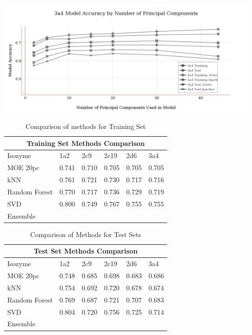\includegraphics[width=1\textwidth]{../img/3a4_moe_model_accuracy.png}

\begin{table}[h]
\begin{tabular}{|l|l|l|l|l|l|}
\hline
\multicolumn{6}{|c|}{Training Set Methods Comparison} \\ \hline
Isozyme       & 1a2   & 2c9   & 2c19  & 2d6   & 3a4   \\ \hline
MOE 20pc      & 0.741 & 0.710 & 0.705 & 0.705 & 0.705 \\ \hline
kNN           & 0.761 & 0.721 & 0.730 & 0.717 & 0.716 \\ \hline
Random Forest & 0.770 & 0.717 & 0.736 & 0.729 & 0.719 \\ \hline
SVD           & 0.800 & 0.749 & 0.767 & 0.755 & 0.755 \\ \hline
Ensemble      &       &       &       &       &       \\ \hline
\end{tabular}
\caption{Comparison of methods for Training Set}
\end{table}


\begin{table}[h]
\begin{tabular}{|l|l|l|l|l|l|}
\hline
\multicolumn{6}{|c|}{Test Set Methods Comparison}     \\ \hline
Isozyme       & 1a2   & 2c9   & 2c19  & 2d6   & 3a4   \\ \hline
MOE 20pc      & 0.748 & 0.685 & 0.698 & 0.683 & 0.686 \\ \hline
kNN           & 0.754 & 0.692 & 0.720 & 0.678 & 0.674 \\ \hline
Random Forest & 0.769 & 0.687 & 0.721 & 0.707 & 0.683 \\ \hline
SVD           & 0.804 & 0.720 & 0.756 & 0.725 & 0.714 \\ \hline
Ensemble      &       &       &       &       &       \\ \hline
\end{tabular}
\caption{Comparison of Methods for Test Sets}
\end{table}

